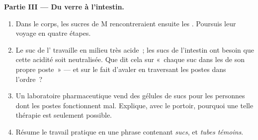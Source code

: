 \begin{problem}
\medskip\noindent\textbf{Partie III --- Du verre à l'intestin.}
\begin{enumerate}[resume]
  \item Dans le corps, les sucres de M rencontreraient ensuite les
        . Poursuis leur voyage en quatre étapes.
  \item Le suc de l' travaille en milieu très acide~; les
        sucs de l'intestin ont besoin que cette acidité soit
        neutralisée. Que dit cela sur «~chaque suc dans les
         de son propre poste~» --- et sur le fait
        d'avaler en traversant les postes dans l'ordre~?
  \item Un laboratoire pharmaceutique vend des gélules de sucs pour
        les personnes dont les postes fonctionnent mal. Explique,
        avec le portoir, pourquoi une telle thérapie est seulement
        possible.
  \item Résume le travail pratique en une phrase contenant
        \emph{sucs}, \emph{} et \emph{tubes témoins}.
\end{enumerate}
\end{problem}
